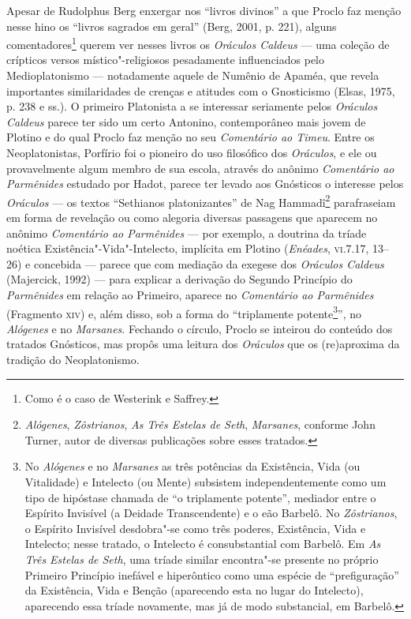 Apesar de Rudolphus Berg enxergar nos “livros divinos” a que
Proclo faz menção nesse hino os “livros sagrados em geral”
(Berg, 2001, p. 221), alguns comentadores\footnote{ Como é o
caso de Westerink e Saffrey.} querem ver nesses livros os
\emph{Oráculos Caldeus} --- uma coleção de crípticos versos
místico"-religiosos pesadamente influenciados pelo
Medioplatonismo --- notadamente aquele de Numênio de Apaméa, que
revela importantes similaridades de crenças e atitudes com o
Gnosticismo (Elsas, 1975, p. 238 e ss.). O primeiro Platonista a
se interessar seriamente pelos \emph{Oráculos Caldeus} parece
ter sido um certo Antonino, contemporâneo mais jovem de Plotino
e do qual Proclo faz menção no seu \emph{Comentário ao Timeu}.
Entre os Neoplatonistas, Porfírio foi o pioneiro do uso
filosófico dos \emph{Oráculos}, e ele ou provavelmente algum
membro de sua escola, através do anônimo \emph{Comentário ao
Parmênides} estudado por Hadot, parece ter levado aos Gnósticos
o interesse pelos \emph{Oráculos} --- os textos “Sethianos
platonizantes” de Nag Hammadî\footnote{ \emph{Alógenes},
\emph{Zôstrianos}, \emph{As Três Estelas de Seth},
\emph{Marsanes}, conforme John Turner, autor de diversas
publicações sobre esses tratados.} parafraseiam em forma de
revelação ou como alegoria diversas passagens que aparecem no
anônimo \emph{Comentário ao Parmênides} --- por exemplo, a
doutrina da tríade noética Existência"-Vida"-Intelecto, implícita
em Plotino (\emph{Enéades}, \textsc{vi}.7.17, 13--26) e concebida ---
parece que com mediação da exegese dos \emph{Oráculos Caldeus}
(Majercick, 1992) --- para explicar a derivação do Segundo
Princípio do \emph{Parmênides} em relação ao Primeiro, aparece
no \emph{Comentário ao Parmênides} (Fragmento \textsc{xiv}) e, além
disso, sob a forma do “triplamente potente\footnote{ No
\emph{Alógenes} e no \emph{Marsanes} as três potências da
Existência, Vida (ou Vitalidade) e Intelecto (ou Mente)
subsistem independentemente como um tipo de hipóstase chamada de
“o triplamente potente”, mediador entre o Espírito Invisível (a
Deidade Transcendente) e o eão Barbelô. No \emph{Zôstrianos},
o Espírito Invisível desdobra"-se como três poderes, Existência,
Vida e Intelecto; nesse tratado, o Intelecto é consubstantial
com Barbelô. Em \emph{As Três Estelas de Seth}, uma tríade
similar encontra"-se presente no próprio Primeiro Princípio
inefável e hiperôntico como uma espécie de “prefiguração” da
Existência, Vida e Benção (aparecendo esta no lugar do
Intelecto), aparecendo essa tríade novamente, mas já de modo
substancial, em Barbelô.}”, no \emph{Alógenes} e no
\emph{Marsanes}. Fechando o círculo, Proclo se inteirou do
conteúdo dos tratados Gnósticos, mas propôs uma leitura dos
\emph{Oráculos} que os (re)aproxima da tradição do
Neoplatonismo. 

